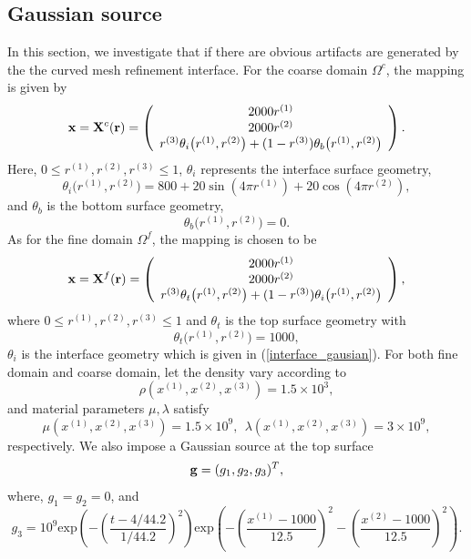 \subsection{Gaussian source}\label{gaussian_source}
In this section, we investigate that if there are obvious artifacts are generated by the the curved mesh refinement interface. For the coarse domain $\Omega^c$, the mapping is given by
\[ {\bf x} = {\bf X}^c({\bf r}) = \left(\begin{array}{c}
2000 r^{(1)}\\
2000 r^{(2)}\\
r^{(3)} \theta_i\big(r^{(1)}, r^{(2)}\big) + (1-r^{(3)}) \theta_b\big(r^{(1)},r^{(2)}\big) \end{array}\right). \]
Here, $0\leq r^{(1)}, r^{(2)}, r^{(3)}\leq 1$, $\theta_i$ represents the interface surface geometry,
\begin{equation}\label{interface_gausian}
\theta_i\big(r^{(1)},r^{(2)}\big) = 800+20\sin(4\pi r^{(1)})+20\cos(4\pi r^{(2)}),
\end{equation}
and $\theta_b$ is the bottom surface geometry,
\begin{equation*}
\theta_b\big(r^{(1)},r^{(2)}\big) = 0.
\end{equation*}
As for the fine domain $\Omega^f$, the mapping is chosen to be
\[ {\bf x} = {\bf X}^f({\bf r}) = \left(\begin{array}{c}
2000 r^{(1)}\\
2000 r^{(2)}\\
r^{(3)}\theta_t\big(r^{(1)},r^{(2)}\big) + (1-r^{(3)})\theta_i\big(r^{(1)},r^{(2)}\big)\end{array}\right), \]
where $0\leq r^{(1)}, r^{(2)}, r^{(3)}\leq 1$ and $\theta_t$ is the top surface geometry with
\begin{equation*}
\theta_t\big(r^{(1)},r^{(2)}\big) = 1000,
\end{equation*}
$\theta_i$ is the interface geometry which is given in (\ref{interface_gausian}). For both fine domain and coarse domain, let the density vary according to
\begin{equation*}
\rho(x^{(1)},x^{(2)},x^{(3)}) = 1.5\times 10^3,
\end{equation*}
and material parameters $\mu, \lambda$ satisfy
\begin{equation*}
\mu(x^{(1)},x^{(2)},x^{(3)}) = 1.5\times 10^9,\ \ 
\lambda(x^{(1)},x^{(2)},x^{(3)})  = 3\times 10^9,
\end{equation*}
respectively. We also impose a Gaussian source at the top surface
\[{\bf g} = (g_1,g_2,g_3)^T ,\]
where, $g_1 = g_2 = 0$, and 
\[g_3 = 10^9 \text{exp}\left(-\left(\frac{t-4/44.2}{1/44.2}\right)^2\right)\text{exp}\left(-\left(\frac{x^{(1)}-1000}{12.5}\right)^2-\left(\frac{x^{(2)}-1000}{12.5}\right)^2\right).\]

